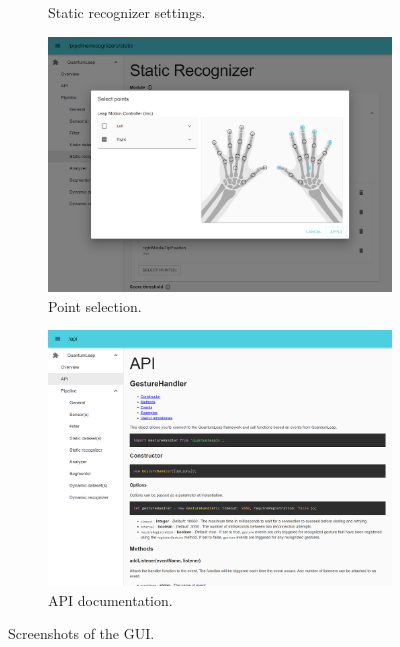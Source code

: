 \begin{figure}[ht]
\begin{subfigure}{.49\textwidth}
        \vspace{-15pt}
        \captionsetup{width=.9\linewidth}
        \caption{Static recognizer settings.}
        \label{fig:quantumleap:ui:3}
    \end{subfigure}
    
    \begin{subfigure}{.49\textwidth}
        \centering
        \includegraphics[width=\linewidth]{Figures/QuantumLeap/UI/module-point_selection.pdf}  
        \vspace{-15pt}
        \captionsetup{width=.9\linewidth}
        \caption{Point selection.}
        \label{fig:quantumleap:ui:4}
    \end{subfigure}
    \begin{subfigure}{.49\textwidth}
        \centering
        \includegraphics[width=\linewidth]{Figures/QuantumLeap/UI/api.pdf}  
        \vspace{-15pt}
        \captionsetup{width=.9\linewidth}
        \caption{API documentation.}
        \label{fig:quantumleap:ui:2}
    \end{subfigure}

    \vspace{-8pt}
    \caption{Screenshots of the \ql GUI.}
    \label{fig:quantumleap:ui}
    \vspace{-12pt}
\end{figure}

